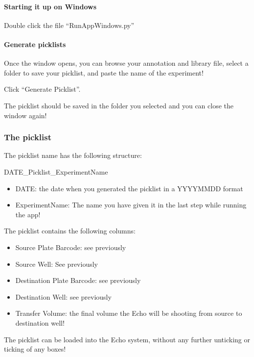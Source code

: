\documentclass[
]{article}
\providecommand{\tightlist}{%
  \setlength{\itemsep}{0pt}\setlength{\parskip}{0pt}}
\begin{document}
\hypertarget{starting-it-up-on-windows}{%
\paragraph{Starting it up on Windows}\label{starting-it-up-on-windows}}

Double click the file ``RunAppWindows.py''

\hypertarget{generate-picklists}{%
\paragraph{Generate picklists}\label{generate-picklists}}

Once the window opens, you can browse your annotation and library file,
select a folder to save your picklist, and paste the name of the
experiment!

Click ``Generate Picklist''.

The picklist should be saved in the folder you selected and you can
close the window again!

\hypertarget{the-picklist}{%
\subsubsection{The picklist}\label{the-picklist}}

The picklist name has the following structure:

DATE\_Picklist\_ExperimentName

\begin{itemize}
\tightlist
\item
  DATE: the date when you generated the picklist in a YYYYMMDD format\\
\item
  ExperimentName: The name you have given it in the last step while
  running the app!
\end{itemize}

The picklist contains the following columns:

\begin{itemize}
\tightlist
\item
  Source Plate Barcode: see previously\\
\item
  Source Well: See previously\\
\item
  Destination Plate Barcode: see previously\\
\item
  Destination Well: see previously\\
\item
  Transfer Volume: the final volume the Echo will be shooting from
  source to destination well!
\end{itemize}

The picklist can be loaded into the Echo system, without any further
unticking or ticking of any boxes!
\end{document}
